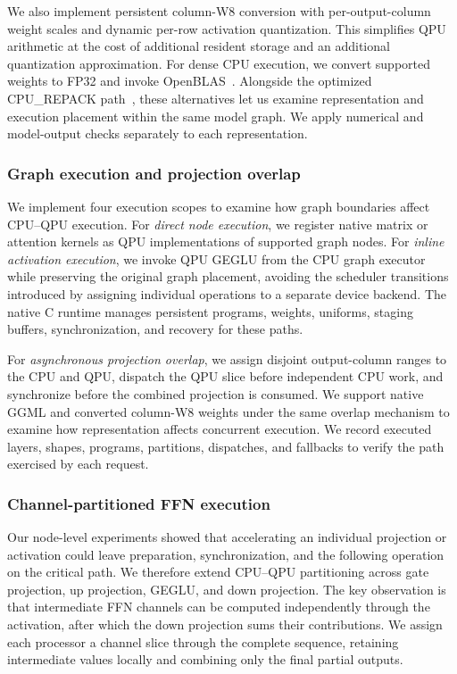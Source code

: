 \documentclass[sigplan,screen,review]{acmart}
\begin{document}
We also implement persistent column-W8 conversion with per-output-column weight scales and dynamic per-row activation quantization. This simplifies QPU arithmetic at the cost of additional resident storage and an additional quantization approximation. For dense CPU execution, we convert supported weights to FP32 and invoke OpenBLAS~\cite{openblas}. Alongside the optimized CPU\_REPACK path~\cite{llamacpp}, these alternatives let us examine representation and execution placement within the same model graph. We apply numerical and model-output checks separately to each representation.

\subsubsection{Graph execution and projection overlap}

We implement four execution scopes to examine how graph boundaries affect CPU--QPU execution. For \emph{direct node execution}, we register native matrix or attention kernels as QPU implementations of supported graph nodes. For \emph{inline activation execution}, we invoke QPU GEGLU from the CPU graph executor while preserving the original graph placement, avoiding the scheduler transitions introduced by assigning individual operations to a separate device backend. The native C runtime manages persistent programs, weights, uniforms, staging buffers, synchronization, and recovery for these paths.

For \emph{asynchronous projection overlap}, we assign disjoint output-column ranges to the CPU and QPU, dispatch the QPU slice before independent CPU work, and synchronize before the combined projection is consumed. We support native GGML and converted column-W8 weights under the same overlap mechanism to examine how representation affects concurrent execution. We record executed layers, shapes, programs, partitions, dispatches, and fallbacks to verify the path exercised by each request. 



\subsubsection{Channel-partitioned FFN execution}
\label{sec:ffn}

Our node-level experiments showed that accelerating an individual projection or activation could leave preparation, synchronization, and the following operation on the critical path. We therefore extend CPU--QPU partitioning across gate projection, up projection, GEGLU, and down projection. The key observation is that intermediate FFN channels can be computed independently through the activation, after which the down projection sums their contributions. We assign each processor a channel slice through the complete sequence, retaining intermediate values locally and combining only the final partial outputs. 
\end{document}

